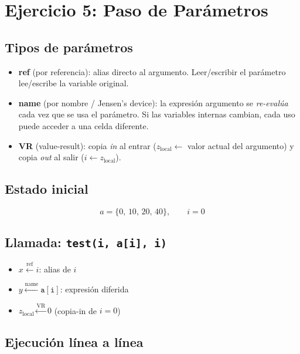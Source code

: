 \documentclass[11pt]{article}
\begin{document}
\section{Ejercicio 5: Paso de Parámetros}


\subsection*{Tipos de parámetros}

\begin{itemize}
    \item \textbf{ref} (por referencia): alias directo al argumento.
          Leer/escribir el parámetro lee/escribe la variable original.
    \item \textbf{name} (por nombre / Jensen's device):
          la expresión argumento se \emph{re-evalúa} cada vez que se usa
          el parámetro.  Si las variables internas cambian, cada uso puede
          acceder a una celda diferente.
    \item \textbf{VR} (value-result): copia \emph{in} al entrar
          ($z_{\text{local}} \leftarrow $ valor actual del argumento) y
          copia \emph{out} al salir ($i \leftarrow z_{\text{local}}$).

\end{itemize}

\subsection*{Estado inicial}

\[
  a = \{0,\,10,\,20,\,40\}, \qquad i = 0
\]

\subsection*{Llamada: \texttt{test(i, a[i], i)}}

\begin{itemize}
  \item $x \xleftarrow{\text{ref}} i$: alias de $i$
  \item $y \xleftarrow{\text{name}} \mathtt{a[i]}$: expresión diferida
  \item $z_{\text{local}} \xleftarrow{\text{VR}} 0$ (copia-in de $i=0$)
\end{itemize}

\subsection*{Ejecución línea a línea}
\end{document}

